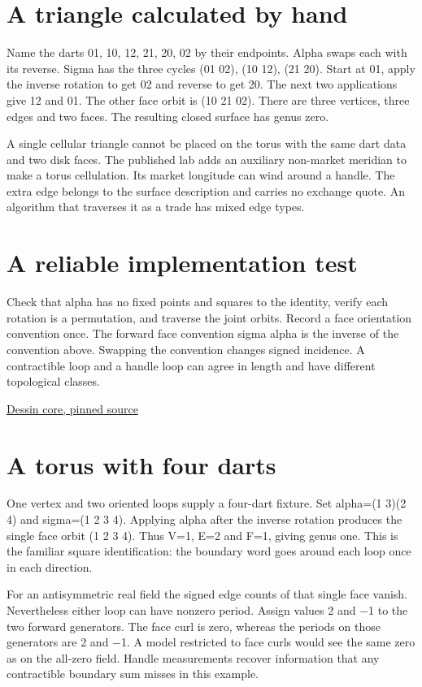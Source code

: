 \documentclass[11pt,oneside,openany]{book}
\begin{document}
\section*{A triangle calculated by hand}
Name the darts 01, 10, 12, 21, 20, 02 by their endpoints. Alpha swaps each with its reverse. Sigma has the three cycles (01 02), (10 12), (21 20). Start at 01, apply the inverse rotation to get 02 and reverse to get 20. The next two applications give 12 and 01. The other face orbit is (10 21 02). There are three vertices, three edges and two faces. The resulting closed surface has genus zero.

A single cellular triangle cannot be placed on the torus with the same dart data and two disk faces. The published lab adds an auxiliary non-market meridian to make a torus cellulation. Its market longitude can wind around a handle. The extra edge belongs to the surface description and carries no exchange quote. An algorithm that traverses it as a trade has mixed edge types.

\section*{A reliable implementation test}
Check that alpha has no fixed points and squares to the identity, verify each rotation is a permutation, and traverse the joint orbits. Record a face orientation convention once. The forward face convention sigma alpha is the inverse of the convention above. Swapping the convention changes signed incidence. A contractible loop and a handle loop can agree in length and have different topological classes.

{\small\sffamily\href{https://github.com/amelie-iska/GRH-research/blob/e941b50772fb5aff322644badfbe9fb260b4d46c/papers/dessin-core.tex}{Dessin core, pinned source}\par}
\section*{A torus with four darts}
One vertex and two oriented loops supply a four-dart fixture. Set alpha=(1 3)(2 4) and sigma=(1 2 3 4). Applying alpha after the inverse rotation produces the single face orbit (1 2 3 4). Thus V=1, E=2 and F=1, giving genus one. This is the familiar square identification: the boundary word goes around each loop once in each direction.

For an antisymmetric real field the signed edge counts of that single face vanish. Nevertheless either loop can have nonzero period. Assign values 2 and \ensuremath{-}1 to the two forward generators. The face curl is zero, whereas the periods on those generators are 2 and \ensuremath{-}1. A model restricted to face curls would see the same zero as on the all-zero field. Handle measurements recover information that any contractible boundary sum misses in this example.
\end{document}
